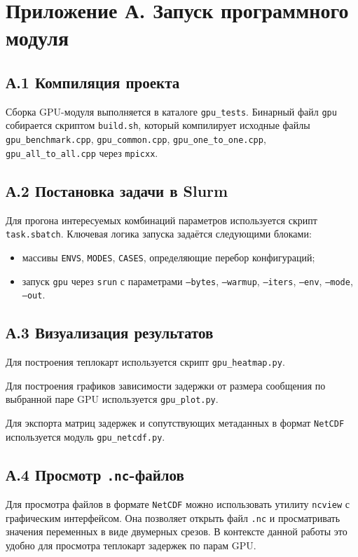 \documentclass[a4paper,14pt]{extarticle}
\begin{document}
\newpage
\appendix
\section*{Приложение А. Запуск программного модуля}

\subsection*{А.1 Компиляция проекта}

Сборка GPU-модуля выполняется в каталоге \texttt{gpu\_tests}. Бинарный файл \texttt{gpu} собирается скриптом \texttt{build.sh}, который компилирует исходные файлы \texttt{gpu\_benchmark.cpp}, \texttt{gpu\_common.cpp}, \texttt{gpu\_one\_to\_one.cpp}, \texttt{gpu\_all\_to\_all.cpp} через \texttt{mpicxx}.

\subsection*{А.2 Постановка задачи в Slurm}

Для прогона интересуемых комбинаций параметров используется скрипт \texttt{task.sbatch}. Ключевая логика запуска задаётся следующими блоками:
\begin{itemize}[leftmargin=2.1cm, itemsep=0.15em, topsep=0.15em, parsep=0pt, partopsep=0pt]
	\item массивы \texttt{ENVS}, \texttt{MODES}, \texttt{CASES}, определяющие перебор конфигураций;
	\item запуск \texttt{gpu} через \texttt{srun} с параметрами \texttt{--bytes}, \texttt{--warmup}, \texttt{--iters}, \texttt{--env}, \texttt{--mode}, \texttt{--out}.
\end{itemize}

\subsection*{А.3 Визуализация результатов}

Для построения теплокарт используется скрипт \texttt{gpu\_heatmap.py}.

Для построения графиков зависимости задержки от размера сообщения по выбранной паре GPU используется \texttt{gpu\_plot.py}.

Для экспорта матриц задержек и сопутствующих метаданных в формат \texttt{NetCDF} используется модуль \texttt{gpu\_netcdf.py}.

\subsection*{А.4 Просмотр \texttt{.nc}-файлов}

Для просмотра файлов в формате \texttt{NetCDF} можно использовать утилиту \texttt{ncview} с графическим интерфейсом. Она позволяет открыть файл \texttt{.nc} и просматривать значения переменных в виде двумерных срезов. В контексте данной работы это удобно для просмотра теплокарт задержек по парам GPU.
\end{document}
